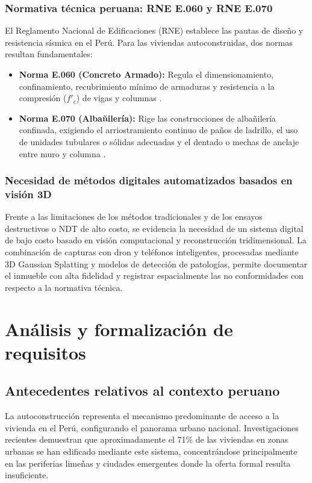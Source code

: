 \documentclass[12pt,oneside]{report}
\begin{document}
\subsection{Normativa técnica peruana: RNE E.060 y RNE E.070}
El Reglamento Nacional de Edificaciones (RNE) establece las pautas de diseño y resistencia sísmica en el Perú. Para las viviendas autoconstruidas, dos normas resultan fundamentales:
\begin{itemize}
  \item \textbf{Norma E.060 (Concreto Armado):} Regula el dimensionamiento, confinamiento, recubrimiento mínimo de armaduras y resistencia a la compresión ($f'_c$) de vigas y columnas \citep{rneportal}.
  \item \textbf{Norma E.070 (Albañilería):} Rige las construcciones de albañilería confinada, exigiendo el arriostramiento continuo de paños de ladrillo, el uso de unidades tubulares o sólidas adecuadas y el dentado o mechas de anclaje entre muro y columna \citep{rneportal}.
\end{itemize}

\subsection{Necesidad de métodos digitales automatizados basados en visión 3D}
Frente a las limitaciones de los métodos tradicionales y de los ensayos destructivos o NDT de alto costo, se evidencia la necesidad de un sistema digital de bajo costo basado en visión computacional y reconstrucción tridimensional. La combinación de capturas con dron y teléfonos inteligentes, procesadas mediante 3D Gaussian Splatting y modelos de detección de patologías, permite documentar el inmueble con alta fidelidad y registrar espacialmente las no conformidades con respecto a la normativa técnica.

\chapter{Análisis y formalización de requisitos}

\section{Antecedentes relativos al contexto peruano}
La autoconstrucción representa el mecanismo predominante de acceso a la vivienda en el Perú, configurando el panorama urbano nacional. Investigaciones recientes demuestran que aproximadamente el 71\% de las viviendas en zonas urbanas se han edificado mediante este sistema, concentrándose principalmente en las periferias limeñas y ciudades emergentes donde la oferta formal resulta insuficiente.\par
\end{document}
